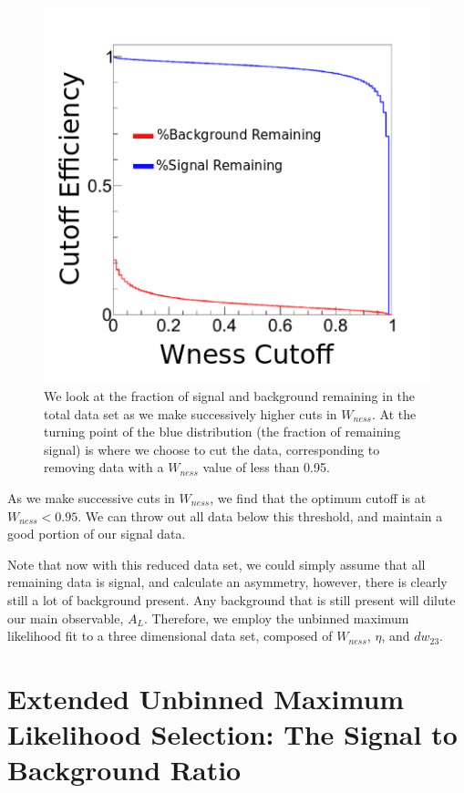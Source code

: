 \begin{figure}
  \centering
  \includegraphics[width=0.7\linewidth]{./figures/wness_cut_efficiency.png}
  \caption{
    We look at the fraction of signal and background remaining in the total data
    set as we make successively higher cuts in $W_{ness}$. At the turning point
    of the blue distribution (the fraction of remaining signal) is where we
    choose to cut the data, corresponding to removing data with a $W_{ness}$
    value of less than 0.95.
  }
  \label{fig:wness_cut_efficiency}
\end{figure}

As we make successive cuts in $W_{ness}$, we find that the optimum cutoff is at
$W_{ness} < 0.95$. We can throw out all data below this threshold, and
maintain a good portion of our signal data.

Note that now with this reduced data set, we could simply assume that all
remaining data is signal, and calculate an asymmetry, however, there is clearly
still a lot of background present. Any background that is still present will
dilute our main observable, $A_L$. Therefore, we employ the unbinned maximum
likelihood fit to a three dimensional data set, composed of $W_{ness}$, $\eta$,
and $dw_{23}$.

\clearpage
\section{Extended Unbinned Maximum Likelihood Selection: The Signal to
Background Ratio}
\label{sec:sbr}

